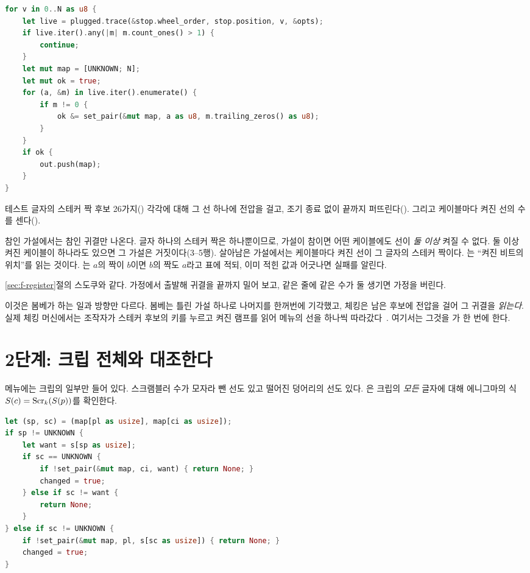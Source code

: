 \begin{lstlisting}[language=Rust,caption={\code{check.rs}: 스테커 가설(일부).}]
for v in 0..N as u8 {
    let live = plugged.trace(&stop.wheel_order, stop.position, v, &opts);
    if live.iter().any(|m| m.count_ones() > 1) {
        continue;
    }
    let mut map = [UNKNOWN; N];
    let mut ok = true;
    for (a, &m) in live.iter().enumerate() {
        if m != 0 {
            ok &= set_pair(&mut map, a as u8, m.trailing_zeros() as u8);
        }
    }
    if ok {
        out.push(map);
    }
}
\end{lstlisting}

테스트 글자의 스테커 짝 후보 26가지() 각각에 대해 그 선 하나에 전압을 걸고, 조기 종료 없이 끝까지
퍼뜨린다(). 그리고 케이블마다 켜진 선의 수를 센다().

\Why 참인 가설에서는 참인 귀결만 나온다. 글자 하나의 스테커 짝은 하나뿐이므로, 가설이 참이면 어떤 케이블에도
선이 \emph{둘 이상} 켜질 수 없다. 둘 이상 켜진 케이블이 하나라도 있으면 그 가설은 거짓이다(3--5행).
살아남은 가설에서는 케이블마다 켜진 선이 그 글자의 스테커 짝이다. 는 ``켜진 비트의
위치''를 읽는 것이다. 는 $a$의 짝이 $b$이면 $b$의 짝도 $a$라고 표에 적되, 이미 적힌 값과
어긋나면 실패를 알린다.

\General \ref{sec:f-register}절의 스도쿠와 같다. 가정에서 출발해 귀결을 끝까지 밀어 보고, 같은 줄에 같은 수가
둘 생기면 가정을 버린다.

\Ours 이것은 봄베가 하는 일과 방향만 다르다. 봄베는 틀린 가설 하나로 나머지를 한꺼번에 기각했고, 체킹은
남은 후보에 전압을 걸어 그 귀결을 \emph{읽는다}. 실제 체킹 머신에서는 조작자가 스테커 후보의 키를 누르고
켜진 램프를 읽어 메뉴의 선을 하나씩 따라갔다~\cite[12--16]{us6812report1944}. 여기서는 그것을
가 한 번에 한다.

\section{2단계: 크립 전체와 대조한다}

메뉴에는 크립의 일부만 들어 있다. 스크램블러 수가 모자라 뺀 선도 있고 떨어진 덩어리의 선도 있다.
은 크립의 \emph{모든} 글자에 대해 에니그마의 식
$S(c) = \mathrm{Scr}_k(S(p))$를 확인한다.

\begin{lstlisting}[language=Rust,caption={\code{check.rs}: 크립 한 글자의 대조(일부).}]
let (sp, sc) = (map[pl as usize], map[ci as usize]);
if sp != UNKNOWN {
    let want = s[sp as usize];
    if sc == UNKNOWN {
        if !set_pair(&mut map, ci, want) { return None; }
        changed = true;
    } else if sc != want {
        return None;
    }
} else if sc != UNKNOWN {
    if !set_pair(&mut map, pl, s[sc as usize]) { return None; }
    changed = true;
}
\end{lstlisting}

